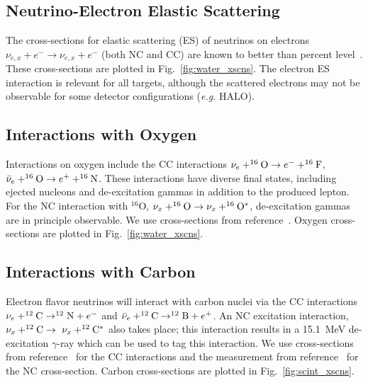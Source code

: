\documentclass{article}
\begin{document}
\subsection{Neutrino-Electron Elastic Scattering}\label{subsec:nu-e-elastic}

The cross-sections for elastic scattering (ES) of neutrinos on electrons $\nu_{e,x} + e^- \rightarrow \nu_{e,x} + e^-$ (both NC and CC) are known to better than percent level~\cite{Marciano:2003eq}. These cross-sections are plotted in Fig.~\ref{fig:water_xscns}. The electron ES interaction is relevant for all targets, although the scattered electrons may not be observable for some detector configurations (\textit{e.g.} HALO).

\subsection{Interactions with Oxygen}

Interactions on oxygen include the CC interactions $\nu_e+^{16}{\rm
  O}\rightarrow e^-+^{16}{\rm F}$, $\bar{\nu}_e+^{16}{\rm O}
\rightarrow e^++^{16}{\rm N}$.
These interactions have diverse final states, including
ejected nucleons and de-excitation gammas in addition to the produced
lepton.  For the NC interaction with $^{16}$O, $\nu_x+^{16}{\rm O}
\rightarrow \nu_x+ ^{16}{\rm O}^*$, de-excitation gammas are in principle
observable.  We use cross-sections from reference~\cite{Kolbe:2002gk}.
Oxygen cross-sections are plotted in Fig.~\ref{fig:water_xscns}.

\subsection{Interactions with Carbon}

Electron flavor neutrinos will interact with carbon nuclei via the CC interactions $\nu_e+^{12}{\rm C}\rightarrow^{12}{\rm N}+e^-$ and $\bar{\nu}_e +^{12}{\rm C}\rightarrow ^{12}{\rm B}+e^+$. An NC excitation interaction, $\nu_x+^{12}{\rm C}\rightarrow~\nu_x+^{12}{\rm  C}^{*}$ also takes place; this interaction results in a 15.1~MeV de-excitation $\gamma$-ray which can be used to tag this interaction. We use cross-sections from reference~\cite{Kolbe:1999au} for the CC interactions and the measurement from reference~\cite{Armbruster:1998gk} for the NC cross-section. Carbon cross-sections are plotted in Fig.~\ref{fig:scint_xscns}.
\end{document}
